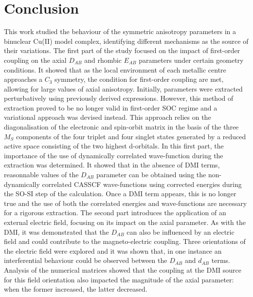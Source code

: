 \documentclass[12pt]{report}
\numberwithin{equation}{section}
\begin{document}
\newpage
\section{Conclusion}

This work studied the behaviour of the symmetric anisotropy parameters in a binuclear Cu(II) model complex, identifying different mechanisms as the source of their variations.
The first part of the study focused on the impact of first-order coupling on the axial $D_{AB}$ and rhombic $E_{AB}$ parameters under certain geometry conditions.
It showed that as the local environment of each metallic centre approaches a $C_3$ symmetry, the condition for first-order coupling are met, allowing for large values of axial anisotropy.
Initially,  parameters were extracted perturbatively using previously derived expressions. 
However, this method of extraction proved to be no longer valid in first-order SOC regime and a variational approach was devised instead.
This approach relies on the diagonalisation of the electronic and spin-orbit matrix in the basis of the three $M_S$ components of the four triplet and four singlet states generated by a reduced active space consisting of the two highest d-orbitals.
In this first part, the importance of the use of dynamically correlated wave-function during the extraction was determined.
It showed that in the absence of DMI terms, reasonnable values of the $D_{AB}$ parameter can be obtained using the non-dynamically correlated CASSCF wave-functions using corrected energies during the SO-SI step of the calculation.
Once a DMI term appears, this is no longer true and the use of both the correlated energies and wave-functions are necessary for a rigorous extraction.
The second part introduces the application of an external electric field, focusing on its impact on the axial parameter.
As with the DMI, it was demonstrated that the $D_{AB}$ can also be influenced by an electric field and could contribute to the magneto-electric coupling.
Three orientations of the electric field were explored and it was shown that, in one instance an interferential behaviour could be observed between the $D_{AB}$ and $d_{AB}$ terms.
Analysis of the numerical matrices showed that the coupling at the DMI source for this field orientation also impacted the magnitude of the axial parameter: when the former increased, the latter decreased.
\end{document}
